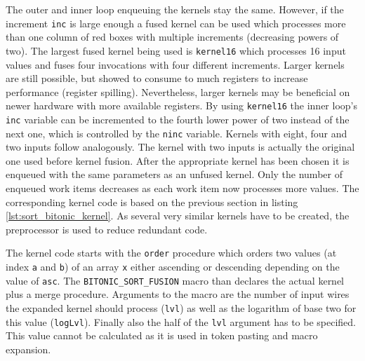 

The outer and inner loop enqueuing the kernels stay the same. However, if the increment \lstinline!inc! is large enough a fused kernel can be used which processes more than one column of red boxes with multiple increments (decreasing powers of two). The largest fused kernel being used is \lstinline!kernel16! which processes 16 input values and fuses four invocations with four different increments. Larger kernels are still possible, but showed to consume to much registers to increase performance (register spilling). Nevertheless, larger kernels may be beneficial on newer hardware with more available registers. By using \lstinline!kernel16! the inner loop's \lstinline!inc! variable can be incremented to the fourth lower power of two instead of the next one, which is controlled by the \lstinline!ninc! variable. Kernels with eight, four and two inputs follow analogously. The kernel with two inputs is actually the original one used before kernel fusion.
After the appropriate kernel has been chosen it is enqueued with the same parameters as an unfused kernel. Only the number of enqueued work items decreases as each work item now processes more values.
The corresponding kernel code is based on the previous section in listing \ref{lst:sort_bitonic_kernel}. As several very similar kernels have to be created, the preprocessor is used to reduce redundant code.



The kernel code starts with the \lstinline!order! procedure which orders two values (at index \lstinline!a! and \lstinline!b!) of an array \lstinline!x! either ascending or descending depending on the value of \lstinline!asc!. The \lstinline!BITONIC_SORT_FUSION! macro than declares the actual kernel plus a merge procedure. Arguments to the macro are the number of input wires the expanded kernel should process (\lstinline!lvl!) as well as the logarithm of base two for this value (\lstinline!logLvl!). Finally also the half of the \lstinline!lvl! argument has to be specified. This value cannot be calculated as it is used in token pasting and macro expansion.

